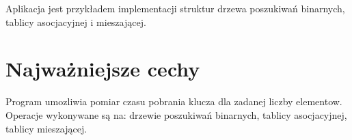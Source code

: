 \-Aplikacja jest przykładem implementacji struktur drzewa poszukiwań binarnych, tablicy asocjacyjnej i mieszającej.\hypertarget{index_etykieta-wazne-cechy}{}\section{\-Najważniejsze cechy}\label{index_etykieta-wazne-cechy}
\-Program umozliwia pomiar czasu pobrania klucza dla zadanej liczby elementow. \-Operacje wykonywane są na\-: drzewie poszukiwań binarnych, tablicy asocjacyjnej, tablicy mieszającej. 